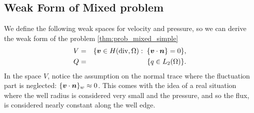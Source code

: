 \subsection{Weak Form of Mixed problem}
We define the following weak spaces for velocity and pressure,
so we can derive the weak form of the problem \eqref{thm:prob_mixed_simple}
\begin{eqnarray}    
    V &=& \{\vc v\in H(\div,\Omega):\; \fluct{\vc v\cdot\vc n} = 0\}, \label{eqn:space_V}\\
    Q &=& \{q \in L_2(\Omega) %
          \}. \label{eqn:space_Q}
\end{eqnarray}
In the space $V$, notice the assumption on the normal trace where the fluctuation part is neglected: $\{\mathbf{\boldsymbol{v}}\cdot \mathbf{\boldsymbol{n}}\}_w \approx 0$.
This comes with the idea of a real situation where the well radius is considered very small and the pressure, and so the flux,
is considered nearly constant along the well edge.

